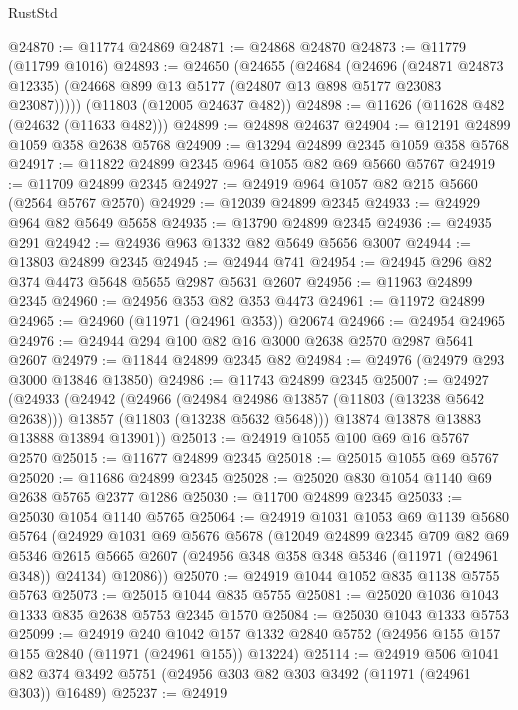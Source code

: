 \begin{lexlean}{RustStd}
\begin{coremodule}
@24870 := @11774 @24869
@24871 := @24868 @24870
@24873 := @11779 (@11799 @1016)
@24893 := @24650
    (@24655
      (@24684
        (@24696
          (@24871 @24873 @12335)
          (@24668 @899 @13 @5177 (@24807 @13 @898 @5177 @23083 @23087)))))
    (@11803 (@12005 @24637 @482))
@24898 := @11626 (@11628 @482 (@24632 (@11633 @482)))
@24899 := @24898 @24637
@24904 := @12191 @24899 @1059 @358 @2638 @5768
@24909 := @13294 @24899 @2345 @1059 @358 @5768
@24917 := @11822 @24899 @2345 @964 @1055 @82 @69 @5660 @5767
@24919 := @11709 @24899 @2345
@24927 := @24919 @964 @1057 @82 @215 @5660 (@2564 @5767 @2570)
@24929 := @12039 @24899 @2345
@24933 := @24929 @964 @82 @5649 @5658
@24935 := @13790 @24899 @2345
@24936 := @24935 @291
@24942 := @24936 @963 @1332 @82 @5649 @5656 @3007
@24944 := @13803 @24899 @2345
@24945 := @24944 @741
@24954 := @24945 @296 @82 @374 @4473 @5648 @5655 @2987 @5631 @2607
@24956 := @11963 @24899 @2345
@24960 := @24956 @353 @82 @353 @4473
@24961 := @11972 @24899
@24965 := @24960 (@11971 (@24961 @353)) @20674
@24966 := @24954 @24965
@24976 := @24944 @294 @100 @82 @16 @3000 @2638 @2570 @2987 @5641 @2607
@24979 := @11844 @24899 @2345 @82
@24984 := @24976 (@24979 @293 @3000 @13846 @13850)
@24986 := @11743 @24899 @2345
@25007 := @24927
    (@24933
      (@24942
        (@24966
          (@24984 @24986 @13857 (@11803 (@13238 @5642 @2638)))
          @13857
          (@11803 (@13238 @5632 @5648)))
        @13874
        @13878
        @13883
        @13888
        @13894
        @13901))
@25013 := @24919 @1055 @100 @69 @16 @5767 @2570
@25015 := @11677 @24899 @2345
@25018 := @25015 @1055 @69 @5767
@25020 := @11686 @24899 @2345
@25028 := @25020 @830 @1054 @1140 @69 @2638 @5765 @2377 @1286
@25030 := @11700 @24899 @2345
@25033 := @25030 @1054 @1140 @5765
@25064 := @24919
    @1031
    @1053
    @69
    @1139
    @5680
    @5764
    (@24929
      @1031
      @69
      @5676
      @5678
      (@12049
        @24899
        @2345
        @709
        @82
        @69
        @5346
        @2615
        @5665
        @2607
        (@24956 @348 @358 @348 @5346 (@11971 (@24961 @348)) @24134)
        @12086))
@25070 := @24919 @1044 @1052 @835 @1138 @5755 @5763
@25073 := @25015 @1044 @835 @5755
@25081 := @25020 @1036 @1043 @1333 @835 @2638 @5753 @2345 @1570
@25084 := @25030 @1043 @1333 @5753
@25099 := @24919
    @240
    @1042
    @157
    @1332
    @2840
    @5752
    (@24956 @155 @157 @155 @2840 (@11971 (@24961 @155)) @13224)
@25114 := @24919
    @506
    @1041
    @82
    @374
    @3492
    @5751
    (@24956 @303 @82 @303 @3492 (@11971 (@24961 @303)) @16489)
@25237 := @24919

\end{coremodule}
\end{lexlean}
